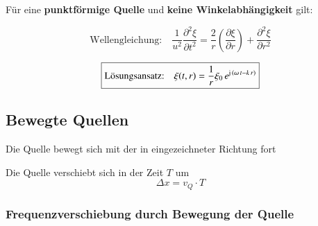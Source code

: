 Für eine \textbf{punktförmige Quelle} und \textbf{keine Winkelabhängigkeit} gilt:

$$ \boxed{ \text{Wellengleichung:} \quad \frac{1}{u^2} \frac{\partial^2 \xi}{\partial t^2} = \frac{2}{r} \left( \frac{\partial \xi}{\partial r} \right) + \frac{\partial^2 \xi}{\partial r^2} }$$

$$ \boxed{ \text{Lösungsansatz:} \quad \xi(t, r) = \frac{1}{r} \xi_0 \, e^{ \mathop{} \! \mathrm{j} \, (\omega \, t - k \, r)} }  $$



\subsection{Bewegte Quellen}

\begin{minipage}[t]{\columnwidth}
    Die Quelle bewegt sich mit der  in eingezeichneter Richtung fort

    \medskip

    Die Quelle verschiebt sich in der Zeit $T$ um 
    $$ \boxed{ \Delta x = v_Q \cdot T }$$
\end{minipage}

\medskip

\centerline{\scalebox{0.6}{}}


\subsubsection{Frequenzverschiebung durch Bewegung der Quelle}


